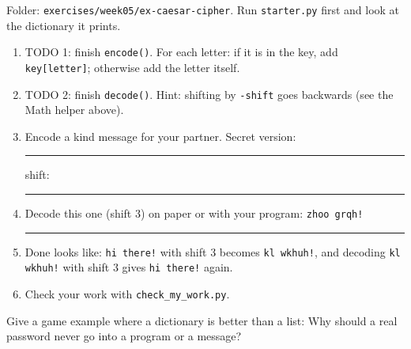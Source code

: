 \begin{exercise}
Folder: \texttt{exercises/week05/ex-caesar-cipher}. Run \texttt{starter.py} first and look at the dictionary it prints.
\begin{enumerate}[leftmargin=1.4em]
  \item TODO 1: finish \texttt{encode()}. For each letter: if it is in the key, add \texttt{key[letter]}; otherwise add the letter itself.
  \item TODO 2: finish \texttt{decode()}. Hint: shifting by \texttt{-shift} goes backwards (see the Math helper above).
  \item Encode a kind message for your partner. Secret version: \rule{6cm}{0.4pt}\quad shift: \rule{1cm}{0.4pt}
  \item Decode this one (shift 3) on paper or with your program: \texttt{zhoo grqh!}\quad \rule{4cm}{0.4pt}
  \item Done looks like: \texttt{hi there!} with shift 3 becomes \texttt{kl wkhuh!}, and decoding \texttt{kl wkhuh!} with shift 3 gives \texttt{hi there!} again.
  \item Check your work with \texttt{check\_my\_work.py}.
\end{enumerate}
\end{exercise}

\begin{vocab}
\end{vocab}

\begin{reflection}
Give a game example where a dictionary is better than a list:
Why should a real password never go into a program or a message?
\end{reflection}

